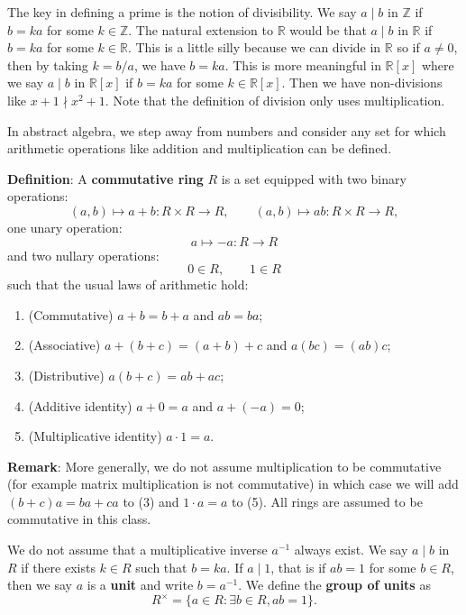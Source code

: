 \documentclass{article}
\def\Z{{\mathbb Z}}
\def\R{{\mathbb R}}
\def\Z{{\mathbb Z}}
\begin{document}
The key in defining a prime is the notion of divisibility. We say $a\mid b$ in $\Z$ if $b = ka$ for some $k\in\Z$. The natural extension to $\R$ would be that $a\mid b$ in $\R$ if $b = ka$ for some $k\in\R$. This is a little silly because we can divide in $\R$ so if $a\neq 0$, then by taking $k = b/a$, we have $b = ka$. This is more meaningful in $\R[x]$ where we say $a\mid b$ in $\R[x]$ if $b = ka$ for some $k\in \R[x]$. Then we have non-divisions like $x+1 \nmid x^2 + 1$. Note that the definition of division only uses multiplication.

In abstract algebra, we step away from numbers and consider any set for which arithmetic operations like addition and multiplication can be defined.

\vspace{5pt}
\noindent\textbf{Definition}: A \textbf{commutative ring} $R$ is a set equipped with two binary operations: $$(a,b)\mapsto a+b:R\times R\rightarrow R,\qquad (a,b)\mapsto ab:R\times R\rightarrow R,$$
one unary operation: $$a\mapsto -a: R\rightarrow R$$
and two nullary operations: $$0\in R,\qquad 1\in R$$
such that the usual laws of arithmetic hold:
\begin{enumerate}[(1)]
    \item (Commutative) $a + b = b + a$ and $ab = ba$;
    \item (Associative) $a + (b + c) = (a + b) + c$ and $a(bc) = (ab)c$;
    \item (Distributive) $a(b + c) = ab + ac$;
    \item (Additive identity) $a + 0 = a$ and $a + (-a) = 0$;
    \item (Multiplicative identity) $a\cdot 1 = a$.
\end{enumerate}

\noindent\textbf{Remark}: More generally, we do not assume multiplication to be commutative (for example matrix multiplication is not commutative) in which case we will add $(b+c)a = ba + ca$ to (3) and $1\cdot a = a$ to (5). All rings are assumed to be commutative in this class.

\vspace{5pt}
We do not assume that a multiplicative inverse $a^{-1}$ always exist. We say $a\mid b$ in $R$ if there exists $k\in R$ such that $b = ka$. If $a\mid 1$, that is if $ab = 1$ for some $b\in R$, then we say $a$ is a \textbf{unit} and write $b = a^{-1}$. We define the \textbf{group of units} as $$R^\times = \{a\in R\colon \exists b\in R, ab = 1\}.$$
\end{document}
